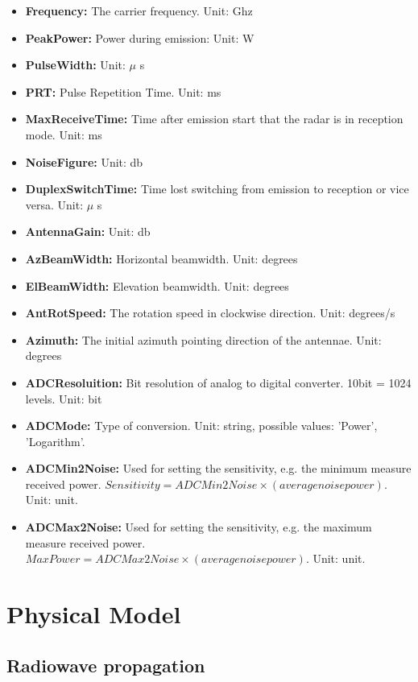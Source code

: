 \documentclass[letterpaper]{book}
\begin{document}
\begin{itemize}
\item \textbf{Frequency:} The carrier frequency. Unit: Ghz
\item \textbf{PeakPower:} Power during emission: Unit: W
\item \textbf{PulseWidth:} Unit: \(\mu\) s
\item \textbf{PRT:} Pulse Repetition Time. Unit: ms
\item \textbf{MaxReceiveTime:} Time after emission start that the radar is in reception mode. Unit: ms
\item \textbf{NoiseFigure:} Unit: db
\item \textbf{DuplexSwitchTime:} Time lost switching from emission to reception or vice versa. Unit: \(\mu\) s
\item \textbf{AntennaGain:} Unit: db
\item \textbf{AzBeamWidth:} Horizontal beamwidth. Unit: degrees
\item \textbf{ElBeamWidth:} Elevation beamwidth. Unit: degrees
\item \textbf{AntRotSpeed:} The rotation speed in clockwise direction. Unit: degrees/s
\item \textbf{Azimuth:} The initial azimuth pointing direction of the antennae. Unit: degrees
\item \textbf{ADCResoluition:} Bit resolution of analog to digital converter. 10bit = 1024 levels. Unit: bit
\item \textbf{ADCMode:} Type of conversion. Unit: string, possible values: 'Power', 'Logarithm'.
\item \textbf{ADCMin2Noise:} Used for setting the sensitivity, e.g. the minimum measure received power. \(Sensitivity = ADCMin2Noise \times (average noise power)\). Unit: unit. 
\item \textbf{ADCMax2Noise:} Used for setting the sensitivity, e.g. the maximum measure received power. \(Max Power = ADCMax2Noise \times (average noise power)\). Unit: unit. 
\end{itemize}

\chapter{Physical Model}
\label{chap:physical_model}
\section{Radiowave propagation}
\end{document}
